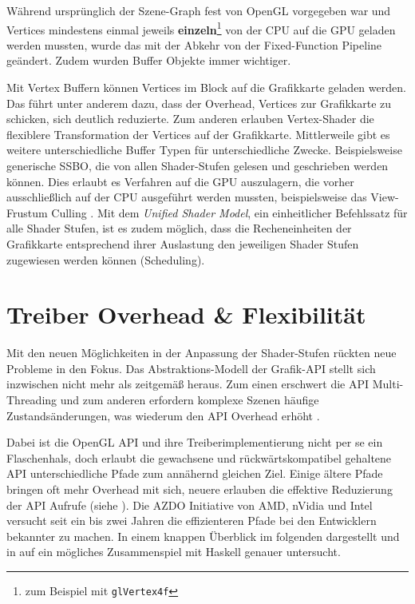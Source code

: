 Während ursprünglich der Szene-Graph fest von OpenGL vorgegeben war und Vertices mindestens einmal jeweils \textbf{einzeln}\footnote{ zum Beispiel mit \texttt{glVertex4f}} von der CPU auf die GPU geladen werden mussten, wurde das mit der Abkehr von der Fixed-Function Pipeline geändert. Zudem wurden Buffer Objekte immer wichtiger.

Mit Vertex Buffern können Vertices im Block auf die Grafikkarte geladen werden. Das führt unter anderem dazu, dass der Overhead, Vertices zur Grafikkarte zu schicken, sich deutlich reduzierte. Zum anderen erlauben Vertex-Shader die flexiblere Transformation der Vertices auf der Grafikkarte. Mittlerweile gibt es weitere unterschiedliche Buffer Typen für unterschiedliche Zwecke. Beispielsweise generische \acf{SSBO}, die von allen Shader-Stufen gelesen und geschrieben werden können. Dies erlaubt es Verfahren auf die GPU auszulagern, die vorher ausschließlich auf der CPU ausgeführt werden mussten, beispielsweise das View-Frustum Culling \parencite{Barczak2008}. Mit dem \textit{Unified Shader Model}, ein einheitlicher Befehlssatz für alle Shader Stufen, ist es zudem möglich, dass die Recheneinheiten der Grafikkarte entsprechend ihrer Auslastung den jeweiligen Shader Stufen zugewiesen werden können (Scheduling).

\section{Treiber Overhead \& Flexibilität}
\label{sec:overhead-und-flexibilitaet}

Mit den neuen Möglichkeiten in der Anpassung der Shader-Stufen rückten neue Probleme in den Fokus. Das Abstraktions-Modell der Grafik-\ac{API} stellt sich inzwischen nicht mehr als zeitgemäß heraus. Zum einen erschwert die \ac{API} Multi-Threading und zum anderen erfordern komplexe Szenen häufige Zustandsänderungen, was wiederum den \ac{API} Overhead erhöht \parencite[Seite 8]{Everitt2014a}.

Dabei ist die OpenGL API und ihre Treiberimplementierung nicht per se ein Flaschenhals, doch erlaubt die gewachsene und rückwärtskompatibel gehaltene API unterschiedliche Pfade zum annähernd gleichen Ziel. Einige ältere Pfade bringen oft mehr Overhead mit sich, neuere erlauben die effektive Reduzierung der API Aufrufe (siehe ). Die \ac{AZDO} Initiative von AMD, nVidia und Intel versucht seit ein bis zwei Jahren die effizienteren Pfade bei den Entwicklern bekannter zu machen. In einem knappen Überblick im folgenden dargestellt und in  auf ein mögliches Zusammenspiel mit Haskell genauer untersucht.

